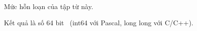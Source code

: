Mức hỗn loạn của tập từ này.

Kết quả là số 64 bit  (int64 với Pascal, long long với C/C++).